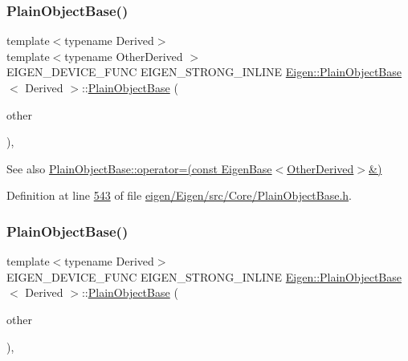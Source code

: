 \subsubsection{\texorpdfstring{Plain\+Object\+Base()}{PlainObjectBase()}\hspace{0.1cm}{\footnotesize\ttfamily [3/6]}}
{\footnotesize\ttfamily template$<$typename Derived$>$ \\
template$<$typename Other\+Derived $>$ \\
E\+I\+G\+E\+N\+\_\+\+D\+E\+V\+I\+C\+E\+\_\+\+F\+U\+NC E\+I\+G\+E\+N\+\_\+\+S\+T\+R\+O\+N\+G\+\_\+\+I\+N\+L\+I\+NE \hyperlink{class_eigen_1_1_plain_object_base}{Eigen\+::\+Plain\+Object\+Base}$<$ Derived $>$\+::\hyperlink{class_eigen_1_1_plain_object_base}{Plain\+Object\+Base} (\begin{DoxyParamCaption}\item[{const \hyperlink{group___core___module_struct_eigen_1_1_eigen_base}{Eigen\+Base}$<$ Other\+Derived $>$ \&}]{other }\end{DoxyParamCaption})\hspace{0.3cm}{\ttfamily [inline]}, {\ttfamily [protected]}}

\begin{DoxySeeAlso}{See also}
\hyperlink{class_eigen_1_1_plain_object_base_a6d280056e43429f043e8b25262ee6153}{Plain\+Object\+Base\+::operator=(const Eigen\+Base$<$\+Other\+Derived$>$\&)} 
\end{DoxySeeAlso}


Definition at line \hyperlink{eigen_2_eigen_2src_2_core_2_plain_object_base_8h_source_l00543}{543} of file \hyperlink{eigen_2_eigen_2src_2_core_2_plain_object_base_8h_source}{eigen/\+Eigen/src/\+Core/\+Plain\+Object\+Base.\+h}.

\mbox{\label{class_eigen_1_1_plain_object_base_a69656a28768b9b6f8b283e251d3552be}} 
\subsubsection{\texorpdfstring{Plain\+Object\+Base()}{PlainObjectBase()}\hspace{0.1cm}{\footnotesize\ttfamily [4/6]}}
{\footnotesize\ttfamily template$<$typename Derived$>$ \\
E\+I\+G\+E\+N\+\_\+\+D\+E\+V\+I\+C\+E\+\_\+\+F\+U\+NC E\+I\+G\+E\+N\+\_\+\+S\+T\+R\+O\+N\+G\+\_\+\+I\+N\+L\+I\+NE \hyperlink{class_eigen_1_1_plain_object_base}{Eigen\+::\+Plain\+Object\+Base}$<$ Derived $>$\+::\hyperlink{class_eigen_1_1_plain_object_base}{Plain\+Object\+Base} (\begin{DoxyParamCaption}\item[{const \hyperlink{class_eigen_1_1_plain_object_base}{Plain\+Object\+Base}$<$ Derived $>$ \&}]{other }\end{DoxyParamCaption})\hspace{0.3cm}{\ttfamily [inline]}, {\ttfamily [protected]}}


